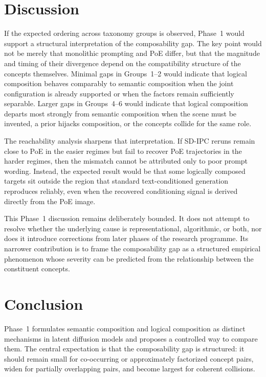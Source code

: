 \documentclass{article}
\begin{document}
\section{Discussion}

If the expected ordering across taxonomy groups is observed, Phase~1 would support a structural interpretation of the composability gap. The key point would not be merely that monolithic prompting and PoE differ, but that the magnitude and timing of their divergence depend on the compatibility structure of the concepts themselves. Minimal gaps in Groups~1--2 would indicate that logical composition behaves comparably to semantic composition when the joint configuration is already supported or when the factors remain sufficiently separable. Larger gaps in Groups~4--6 would indicate that logical composition departs most strongly from semantic composition when the scene must be invented, a prior hijacks composition, or the concepts collide for the same role.

The reachability analysis sharpens that interpretation. If SD-IPC reruns remain close to PoE in the easier regimes but fail to recover PoE trajectories in the harder regimes, then the mismatch cannot be attributed only to poor prompt wording. Instead, the expected result would be that some logically composed targets sit outside the region that standard text-conditioned generation reproduces reliably, even when the recovered conditioning signal is derived directly from the PoE image.

This Phase~1 discussion remains deliberately bounded. It does not attempt to resolve whether the underlying cause is representational, algorithmic, or both, nor does it introduce corrections from later phases of the research programme. Its narrower contribution is to frame the composability gap as a structured empirical phenomenon whose severity can be predicted from the relationship between the constituent concepts.

\section{Conclusion}

Phase~1 formulates semantic composition and logical composition as distinct mechanisms in latent diffusion models and proposes a controlled way to compare them. The central expectation is that the composability gap is structured: it should remain small for co-occurring or approximately factorized concept pairs, widen for partially overlapping pairs, and become largest for coherent collisions.
\end{document}
